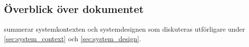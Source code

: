 \subsection{Överblick över dokumentet}

 summerar systemkontexten och systemdesignen som diskuteras utförligare under \ref{sec:system_context} och \ref{sec:system_design}.